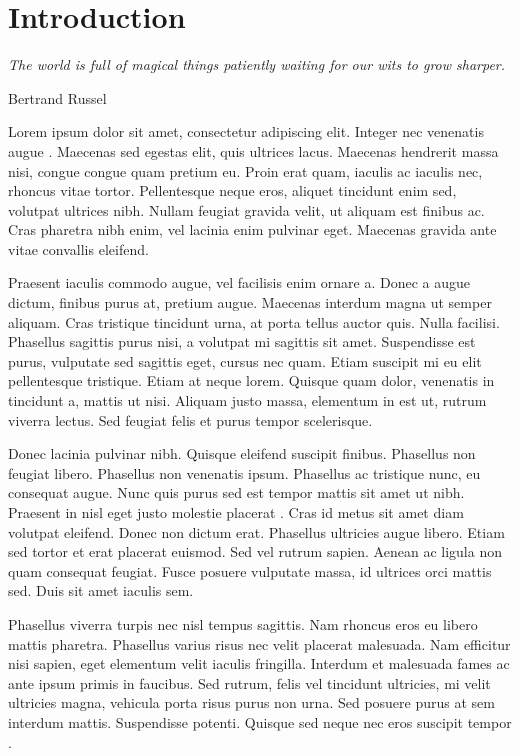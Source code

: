 \chapter{Introduction}
\epigraph{\emph{The world is full of magical things patiently waiting for our wits to grow sharper.}}{Bertrand Russel}

Lorem ipsum dolor sit amet, consectetur adipiscing elit. Integer nec venenatis augue \citep{einstein}. Maecenas sed egestas elit, quis ultrices lacus. Maecenas hendrerit massa nisi, congue congue quam pretium eu. Proin erat quam, iaculis ac iaculis nec, rhoncus vitae tortor. Pellentesque neque eros, aliquet tincidunt enim sed, volutpat ultrices nibh. Nullam feugiat gravida velit, ut aliquam est finibus ac. Cras pharetra nibh enim, vel lacinia enim pulvinar eget. Maecenas gravida ante vitae convallis eleifend.

Praesent iaculis commodo augue, vel facilisis enim ornare a. Donec a augue dictum, finibus purus at, pretium augue. Maecenas interdum magna ut semper aliquam. Cras tristique tincidunt urna, at porta tellus auctor quis. Nulla facilisi. Phasellus sagittis purus nisi, a volutpat mi sagittis sit amet. Suspendisse est purus, vulputate sed sagittis eget, cursus nec quam. Etiam suscipit mi eu elit pellentesque tristique. Etiam at neque lorem. Quisque quam dolor, venenatis in tincidunt a, mattis ut nisi. Aliquam justo massa, elementum in est ut, rutrum viverra lectus. Sed feugiat felis et purus tempor scelerisque.

Donec lacinia pulvinar nibh. Quisque eleifend suscipit finibus. Phasellus non feugiat libero. Phasellus non venenatis ipsum. Phasellus ac tristique nunc, eu consequat augue. Nunc quis purus sed est tempor mattis sit amet ut nibh. Praesent in nisl eget justo molestie placerat \citep{einstein,latexcompanion}. Cras id metus sit amet diam volutpat eleifend. Donec non dictum erat. Phasellus ultricies augue libero. Etiam sed tortor et erat placerat euismod. Sed vel rutrum sapien. Aenean ac ligula non quam consequat feugiat. Fusce posuere vulputate massa, id ultrices orci mattis sed. Duis sit amet iaculis sem.

Phasellus viverra turpis nec nisl tempus sagittis. Nam rhoncus eros eu libero mattis pharetra. Phasellus varius risus nec velit placerat malesuada. Nam efficitur nisi sapien, eget elementum velit iaculis fringilla. Interdum et malesuada fames ac ante ipsum primis in faucibus. Sed rutrum, felis vel tincidunt ultricies, mi velit ultricies magna, vehicula porta risus purus non urna. Sed posuere purus at sem interdum mattis. Suspendisse potenti. Quisque sed neque nec eros suscipit tempor \citep{einstein}.


